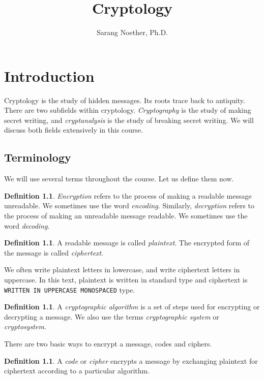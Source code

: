 \documentclass{book}
\title{Cryptology}
\author{Sarang Noether, Ph.D.}
\theoremstyle{plain}
\theoremstyle{definition}
\newtheorem{definition}[theorem]{Definition}
\newcommand{\ciphertext}[1]{\texttt{#1}} %
\begin{document}
\frontmatter
\maketitle
\tableofcontents
\mainmatter

\chapter{Introduction}
Cryptology is the study of hidden messages. Its roots trace back to antiquity. There are two subfields within cryptology. {\it Cryptography} is the study of making secret writing, and {\it cryptanalysis} is the study of breaking secret writing. We will discuss both fields extensively in this course.

\section{Terminology}
We will use several terms throughout the course. Let us define them now.

\begin{definition}
{\it Encryption} refers to the process of making a readable message unreadable. We sometimes use the word {\it encoding.} Similarly, {\it decryption} refers to the process of making an unreadable message readable. We sometimes use the word {\it decoding}.
\end{definition}

\begin{definition}
A readable message is called {\it plaintext}. The encrypted form of the message is called {\it ciphertext}.
\end{definition}

We often write plaintext letters in lowercase, and write ciphertext letters in uppercase. In this text, plaintext is written in standard type and ciphertext is \ciphertext{WRITTEN IN UPPERCASE MONOSPACED} type.

\begin{definition}
A {\it cryptographic algorithm} is a set of steps used for encrypting or decrypting a message. We also use the terms {\it cryptographic system} or {\it cryptosystem}.
\end{definition}

There are two basic ways to encrypt a message, codes and ciphers.

\begin{definition}
A {\it code} or {\it cipher} encrypts a message by exchanging plaintext for ciphertext according to a particular algorithm.
\end{definition}
\end{document}
